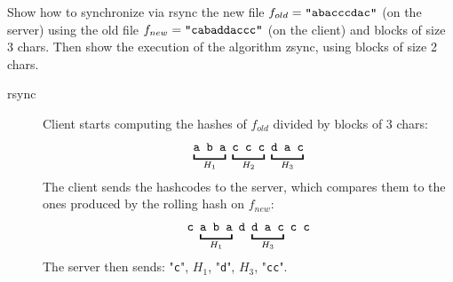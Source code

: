 \exercise

Show how to synchronize via rsync the new file $f_{old} = \text{\tt
“abacccdac”}$ (on the server) using the old file $f_{new} = \text{\tt
“cabaddaccc”}$ (on the client) and blocks of size 3 chars. Then show the
execution of the algorithm zsync, using blocks of size 2 chars.

\solution

\begin{description}

  \item[rsync] Client starts computing the hashes of $f_{old}$ divided by blocks
  of 3 chars:
  \begin{align*}
    \underbracket{\vphantom{\tt g}\texttt{a b a}}_{H_1}\
    \underbracket{\vphantom{\tt g}\texttt{c c c}}_{H_2}\
    \underbracket{\vphantom{\tt g}\texttt{d a c}}_{H_3}
  \end{align*}
  The client sends the hashcodes to the server, which compares them to the ones
  produced by the rolling hash on $f_{new}$:
  \begin{align*}
    \texttt{c}\
    \underbracket{\vphantom{\tt g}\texttt{a b a}}_{H_1}\
    \texttt{d}\
    \underbracket{\vphantom{\tt g}\texttt{d a c}}_{H_3}\
    \texttt{c c}
  \end{align*}
  The server then sends: "{\tt c}", $H_1$, "{\tt d}", $H_3$, "{\tt cc}".


\end{description}
